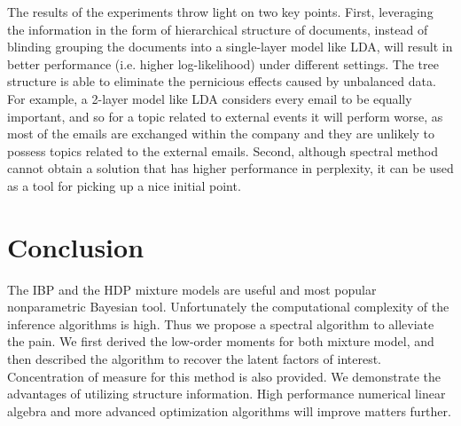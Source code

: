 \documentclass[twoside,11pt]{article}
\begin{document}
{%





The results of the experiments throw light on two key points. First, leveraging the
information in the form of hierarchical structure of documents, instead of
blinding grouping the documents into a single-layer model like LDA,
will result in better performance (i.e. higher log-likelihood) under
different settings. The tree structure is able to eliminate the
pernicious effects caused by unbalanced data. For example, a 2-layer model like LDA
considers every email to be equally important, and so for a topic
related to external events it will perform worse, as most of the
emails are exchanged within the company and they are unlikely to
possess topics related to the external emails. Second, although spectral method cannot obtain a solution that has higher performance in perplexity, it can be used as a tool for picking up a nice initial point.

\section{Conclusion}
The IBP and the HDP mixture models are useful and most popular nonparametric 
Bayesian tool. Unfortunately the computational complexity of the inference
algorithms is high. Thus we propose a spectral algorithm to alleviate
the pain. We first derived the low-order moments for both mixture
model, and then described the algorithm to recover the latent factors
of interest. Concentration of measure for this method is also
provided. We demonstrate the advantages of utilizing structure information.
High performance numerical linear algebra and more advanced
optimization algorithms will improve matters further.





}
\end{document}
